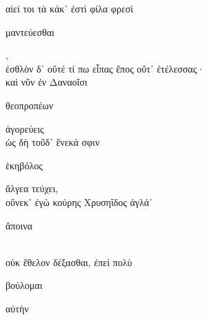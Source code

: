 \documentclass{ransom}
\begin{document}
\begin{foreignpage}
\begin{graytext}
αἰεί τοι τὰ κάκ᾽ ἐστὶ φίλα φρεσὶ \begin{whitetext}μαντεύεσθαι\end{whitetext},\\
ἐσθλὸν δ᾽ οὔτέ τί πω εἶπας ἔπος οὔτ᾽ ἐτέλεσσας·\\
καὶ νῦν ἐν Δαναοῖσι \begin{whitetext}θεοπροπέων\end{whitetext} ἀγορεύεις\\
ὡς δὴ τοῦδ᾽ ἕνεκά σφιν \begin{whitetext}ἑκηβόλος\end{whitetext} ἄλγεα τεύχει,\hfill{}\\
οὕνεκ᾽ ἐγὼ κούρης Χρυσηΐδος ἀγλά᾽ \begin{whitetext}ἄποινα\end{whitetext}\\
οὐκ ἔθελον δέξασθαι, ἐπεὶ πολὺ \begin{whitetext}βούλομαι\end{whitetext} αὐτὴν\\

\end{graytext}


\end{foreignpage}
\end{document}
